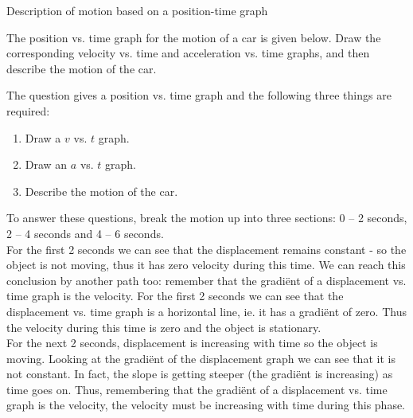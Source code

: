 \begin{wex}{Description of motion based on a position-time graph}{The position vs. time graph for the motion of a car is given below. Draw the corresponding velocity vs. time and acceleration vs. time graphs, and then describe the motion of the car.
\begin{center}
\end{center}
}{%
The question gives a position vs. time graph and the following three things are required:
\begin{enumerate}[label=\textbf{\arabic*}.]
\item Draw a $v$ vs. $t$ graph.
\item Draw an $a$ vs. $t$ graph.
\item Describe the motion of the car.
\end{enumerate}
To answer these questions, break the motion up into three sections: 0 -- 2 seconds, 2 -- 4 seconds and 4 -- 6 seconds.\\

For the first 2 seconds we can see that the displacement remains constant - so the object is not moving, thus it has zero velocity during this time. We can reach this conclusion by another path too: remember that the gradi\"ent of a displacement vs. time graph is the velocity. For the first 2 seconds we can see that the displacement vs. time graph is a horizontal line, ie. it has a gradi\"ent of zero. Thus the velocity during this time is zero and the object is stationary.\\

For the next 2 seconds, displacement is increasing with time so the object is moving. Looking at the gradi\"ent of the displacement graph we can see that it is not constant. In fact, the slope is getting steeper (the gradi\"ent is increasing) as time goes on. Thus, remembering that the gradi\"ent of a displacement vs. time graph is the velocity, the velocity must be increasing with time during this phase.\\

}
\end{wex}
